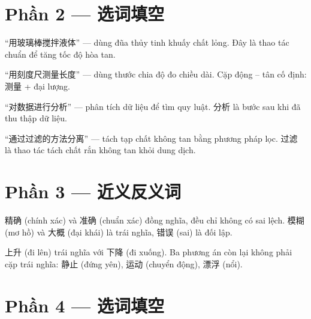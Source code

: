 \documentclass[11pt, a4paper]{article}
\begin{document}
\section*{Phần 2 — 选词填空}

\begin{dapan}[4 — Đáp án A]
“用玻璃棒搅拌液体” — dùng đũa thủy tinh khuấy chất lỏng. Đây là thao tác chuẩn để tăng tốc độ hòa tan.
\end{dapan}

\begin{dapan}[5 — Đáp án B]
“用刻度尺测量长度” — dùng thước chia độ đo chiều dài. Cặp động – tân cố định: 测量 + đại lượng.
\end{dapan}

\begin{dapan}[6 — Đáp án C]
“对数据进行分析” — phân tích dữ liệu để tìm quy luật. 分析 là bước sau khi đã thu thập dữ liệu.
\end{dapan}

\begin{dapan}[7 — Đáp án D]
“通过过滤的方法分离” — tách tạp chất không tan bằng phương pháp lọc. 过滤 là thao tác tách chất rắn không tan khỏi dung dịch.
\end{dapan}

\section*{Phần 3 — 近义反义词}

\begin{dapan}[8 — Đáp án A]
精确 (chính xác) và 准确 (chuẩn xác) đồng nghĩa, đều chỉ không có sai lệch. 模糊 (mơ hồ) và 大概 (đại khái) là trái nghĩa, 错误 (sai) là đối lập.
\end{dapan}

\begin{dapan}[9 — Đáp án D]
上升 (đi lên) trái nghĩa với 下降 (đi xuống). Ba phương án còn lại không phải cặp trái nghĩa: 静止 (đứng yên), 运动 (chuyển động), 漂浮 (nổi).
\end{dapan}

\section*{Phần 4 — 选词填空}
\end{document}
